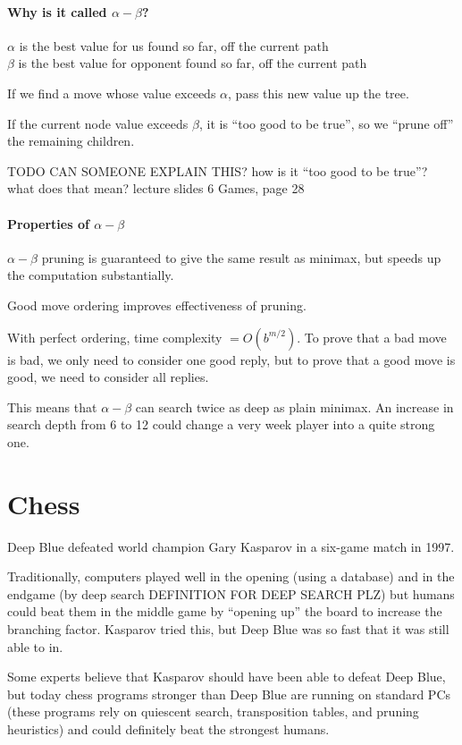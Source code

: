 \paragraph{Why is it called $\alpha-\beta$?}
$\alpha$ is the best value for us found so far, off the current path\\
$\beta$ is the best value for opponent found so far, off the current path

If we find a move whose value exceeds $\alpha$, pass this new value up the
tree.

If the current node value exceeds $\beta$, it is ``too good to be true'', so we
``prune off'' the remaining children.

TODO CAN SOMEONE EXPLAIN THIS? how is it ``too good to be true''? what does that mean?
lecture slides 6 Games, page 28

\paragraph{Properties of $\alpha-\beta$}
$\alpha-\beta$ pruning is guaranteed to give the same result as minimax, but
speeds up the computation substantially.

Good move ordering improves effectiveness of pruning.

With perfect ordering, time complexity $= O(b^{m/2})$. To prove that a bad move
is bad, we only need to consider one good reply, but to prove that a good move
is good, we need to consider all replies.

This means that $\alpha-\beta$ can search twice as deep as plain minimax. An
increase in search depth from 6 to 12 could change a very week player into a
quite strong one.

\section{Chess}
Deep Blue defeated world champion Gary Kasparov in a six-game match in 1997.

Traditionally, computers played well in the opening (using a database) and in
the endgame (by deep search DEFINITION FOR DEEP SEARCH PLZ) but humans could
beat them in the middle game by ``opening up'' the board to increase the
branching factor. Kasparov tried this, but Deep Blue was so fast that it was
still able to in.

Some experts believe that Kasparov should have been able to defeat Deep Blue,
but today chess programs stronger than Deep Blue are running on standard PCs
(these programs rely on quiescent search, transposition tables, and pruning
heuristics) and could definitely beat the strongest humans.

